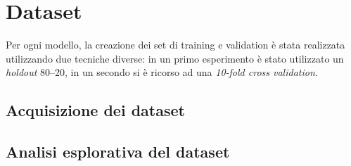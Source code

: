 \chapter{Dataset}


Per ogni modello, la creazione dei set di training e validation è stata 
realizzata utilizzando due tecniche diverse: in un primo esperimento è stato 
utilizzato un \textit{holdout} 80--20, in un secondo si è ricorso ad una 
\textit{10-fold cross validation}.

\section{Acquisizione dei dataset}

\section{Analisi esplorativa del dataset}
\label{chap:analisi-training}
